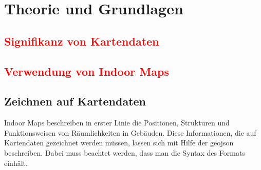 \chapter{Theorie und Grundlagen}
\label{ch:theorybasics}
\section{\textcolor{red}{Signifikanz von Kartendaten}}

\section{\textcolor{red}{Verwendung von Indoor Maps}}

\section{Zeichnen auf Kartendaten}
Indoor Maps beschreiben in erster Linie die Positionen, Strukturen und Funktionsweisen von Räumlichkeiten in Gebäuden. Diese Informationen, die auf Kartendaten gezeichnet werden müssen, lassen sich mit Hilfe der \acs{geojson} beschreiben. Dabei muss beachtet werden, dass man die Syntax des Formats einhält.

